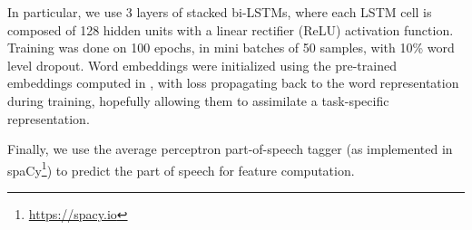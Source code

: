 In particular, we use 3 layers of stacked bi-LSTMs, where each LSTM cell is composed of 128 hidden units
with a linear rectifier (ReLU) \cite{nair2010rectified} activation function.
Training was done on 100 epochs, in mini batches of 50 samples, with 10\% word level
dropout.
Word embeddings were initialized using the pre-trained embeddings computed in , with loss propagating back to the word representation during training, hopefully
allowing them to assimilate a task-specific representation.

Finally, we use the average perceptron part-of-speech tagger (as implemented in spaCy\footnote{\url{https://spacy.io}})
to predict the part of speech for feature computation.%
